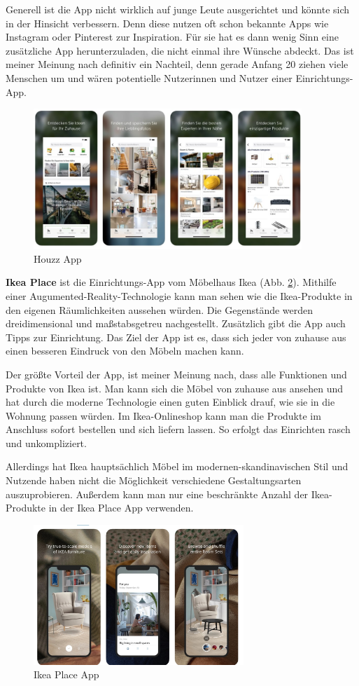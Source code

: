 \documentclass[12pt,paper=a4,oneside,hidelinks,headings=small,captions=heading,captions=nooneline]{scrartcl}
\begin{document}
Generell ist die App nicht wirklich auf junge Leute ausgerichtet und
könnte sich in der Hinsicht verbessern. Denn diese nutzen oft schon
bekannte Apps wie Instagram oder Pinterest zur Inspiration. Für sie
hat es dann wenig Sinn eine zusätzliche App herunterzuladen, die nicht
einmal ihre Wünsche abdeckt. Das ist meiner Meinung nach definitiv ein
Nachteil, denn gerade Anfang 20 ziehen viele Menschen um und wären
potentielle Nutzerinnen und Nutzer einer Einrichtungs-App.

\begin{figure}[htbp]
\centering
\includegraphics[height=200px]{./img/m1_konkurrenzanalyse_01.jpg}
\caption{\label{fig:m1_ko_01}Houzz App}
\end{figure}

\textbf{Ikea Place} ist die Einrichtungs-App vom Möbelhaus Ikea (Abb. \ref{fig:m1_ko_02}). Mithilfe einer
Augumented-Reality-Technologie kann man sehen wie die Ikea-Produkte in
den eigenen Räumlichkeiten aussehen würden. Die Gegenstände werden
dreidimensional und maßstabsgetreu nachgestellt. Zusätzlich gibt die
App auch Tipps zur Einrichtung. Das Ziel der App ist es, dass sich
jeder von zuhause aus einen besseren Eindruck von den Möbeln machen
kann.

Der größte Vorteil der App, ist meiner Meinung nach, dass alle
Funktionen und Produkte von Ikea ist. Man kann sich die Möbel von
zuhause aus ansehen und hat durch die moderne Technologie einen guten
Einblick drauf, wie sie in die Wohnung passen würden. Im
Ikea-Onlineshop kann man die Produkte im Anschluss sofort bestellen
und sich liefern lassen. So erfolgt das Einrichten rasch und
unkompliziert.

Allerdings hat Ikea hauptsächlich Möbel im modernen-skandinavischen
Stil und Nutzende haben nicht die Möglichkeit verschiedene
Gestaltungsarten auszuprobieren. Außerdem kann man nur eine
beschränkte Anzahl der Ikea-Produkte in der Ikea Place App verwenden.

\begin{figure}[htbp]
\centering
\includegraphics[height=200px]{./img/m1_konkurrenzanalyse_02.jpg}
\caption{\label{fig:m1_ko_02}Ikea Place App}
\end{figure}
\end{document}
